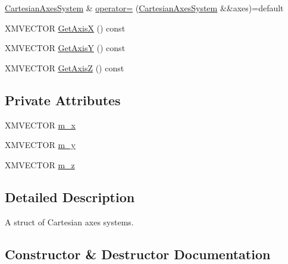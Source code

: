 \begin{DoxyCompactItemize}
\item 
\hyperlink{structmage_1_1_cartesian_axes_system}{Cartesian\+Axes\+System} \& \hyperlink{structmage_1_1_cartesian_axes_system_ad35384f10ad5a84787ef0cc5507955e9}{operator=} (\hyperlink{structmage_1_1_cartesian_axes_system}{Cartesian\+Axes\+System} \&\&axes)=default
\item 
X\+M\+V\+E\+C\+T\+OR \hyperlink{structmage_1_1_cartesian_axes_system_aa8e41490a0f9b333a8a9dde3a7544624}{Get\+AxisX} () const
\item 
X\+M\+V\+E\+C\+T\+OR \hyperlink{structmage_1_1_cartesian_axes_system_a1ab9d19fa733ce9667b244cd4a03b8fc}{Get\+AxisY} () const
\item 
X\+M\+V\+E\+C\+T\+OR \hyperlink{structmage_1_1_cartesian_axes_system_a143811599a089100b0327e719db44ec5}{Get\+AxisZ} () const
\end{DoxyCompactItemize}
\subsection*{Private Attributes}
\begin{DoxyCompactItemize}
\item 
X\+M\+V\+E\+C\+T\+OR \hyperlink{structmage_1_1_cartesian_axes_system_aa840c10ca92782e8c87c1ab53f0b86e9}{m\+\_\+x}
\item 
X\+M\+V\+E\+C\+T\+OR \hyperlink{structmage_1_1_cartesian_axes_system_a2cc6bc4fe185791a877e1418e85d6b47}{m\+\_\+y}
\item 
X\+M\+V\+E\+C\+T\+OR \hyperlink{structmage_1_1_cartesian_axes_system_abc733e5f82104391b0b352d263313d64}{m\+\_\+z}
\end{DoxyCompactItemize}


\subsection{Detailed Description}
A struct of Cartesian axes systems. 

\subsection{Constructor \& Destructor Documentation}
\hypertarget{structmage_1_1_cartesian_axes_system_a8f6ebcd50aafda44c478b7aa25e1fd25}{}\label{structmage_1_1_cartesian_axes_system_a8f6ebcd50aafda44c478b7aa25e1fd25} 
